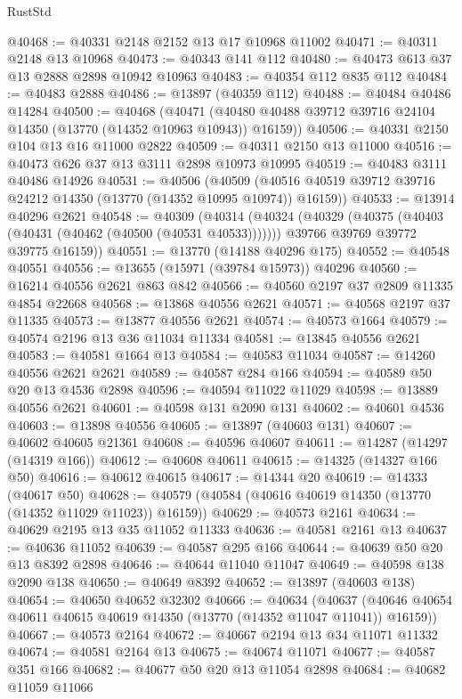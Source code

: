 \begin{lexlean}{RustStd}
\begin{coremodule}
@40468 := @40331 @2148 @2152 @13 @17 @10968 @11002
@40471 := @40311 @2148 @13 @10968
@40473 := @40343 @141 @112
@40480 := @40473 @613 @37 @13 @2888 @2898 @10942 @10963
@40483 := @40354 @112 @835 @112
@40484 := @40483 @2888
@40486 := @13897 (@40359 @112)
@40488 := @40484 @40486 @14284
@40500 := @40468
    (@40471 (@40480 @40488 @39712 @39716 @24104 @14350 (@13770 (@14352 @10963 @10943)) @16159))
@40506 := @40331 @2150 @104 @13 @16 @11000 @2822
@40509 := @40311 @2150 @13 @11000
@40516 := @40473 @626 @37 @13 @3111 @2898 @10973 @10995
@40519 := @40483 @3111 @40486 @14926
@40531 := @40506
    (@40509 (@40516 @40519 @39712 @39716 @24212 @14350 (@13770 (@14352 @10995 @10974)) @16159))
@40533 := @13914 @40296 @2621
@40548 := @40309
    (@40314
      (@40324
        (@40329 (@40375 (@40403 (@40431 (@40462 (@40500 (@40531 @40533)))))))
        @39766
        @39769
        @39772
        @39775
        @16159))
@40551 := @13770 (@14188 @40296 @175)
@40552 := @40548 @40551
@40556 := @13655 (@15971 (@39784 @15973)) @40296
@40560 := @16214 @40556 @2621 @863 @842
@40566 := @40560 @2197 @37 @2809 @11335 @4854 @22668
@40568 := @13868 @40556 @2621
@40571 := @40568 @2197 @37 @11335
@40573 := @13877 @40556 @2621
@40574 := @40573 @1664
@40579 := @40574 @2196 @13 @36 @11034 @11334
@40581 := @13845 @40556 @2621
@40583 := @40581 @1664 @13
@40584 := @40583 @11034
@40587 := @14260 @40556 @2621 @2621
@40589 := @40587 @284 @166
@40594 := @40589 @50 @20 @13 @4536 @2898
@40596 := @40594 @11022 @11029
@40598 := @13889 @40556 @2621
@40601 := @40598 @131 @2090 @131
@40602 := @40601 @4536
@40603 := @13898 @40556
@40605 := @13897 (@40603 @131)
@40607 := @40602 @40605 @21361
@40608 := @40596 @40607
@40611 := @14287 (@14297 (@14319 @166))
@40612 := @40608 @40611
@40615 := @14325 (@14327 @166 @50)
@40616 := @40612 @40615
@40617 := @14344 @20
@40619 := @14333 (@40617 @50)
@40628 := @40579 (@40584 (@40616 @40619 @14350 (@13770 (@14352 @11029 @11023)) @16159))
@40629 := @40573 @2161
@40634 := @40629 @2195 @13 @35 @11052 @11333
@40636 := @40581 @2161 @13
@40637 := @40636 @11052
@40639 := @40587 @295 @166
@40644 := @40639 @50 @20 @13 @8392 @2898
@40646 := @40644 @11040 @11047
@40649 := @40598 @138 @2090 @138
@40650 := @40649 @8392
@40652 := @13897 (@40603 @138)
@40654 := @40650 @40652 @32302
@40666 := @40634
    (@40637 (@40646 @40654 @40611 @40615 @40619 @14350 (@13770 (@14352 @11047 @11041)) @16159))
@40667 := @40573 @2164
@40672 := @40667 @2194 @13 @34 @11071 @11332
@40674 := @40581 @2164 @13
@40675 := @40674 @11071
@40677 := @40587 @351 @166
@40682 := @40677 @50 @20 @13 @11054 @2898
@40684 := @40682 @11059 @11066

\end{coremodule}
\end{lexlean}
